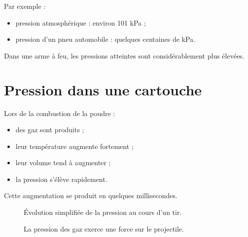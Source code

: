 Par exemple :

\begin{itemize}
    \item pression atmosphérique : environ 101 kPa ;
    \item pression d'un pneu automobile : quelques centaines de kPa.
\end{itemize}

Dans une arme à feu, les pressions atteintes sont considérablement plus
élevées.

\section{Pression dans une cartouche}

Lors de la combustion de la poudre :

\begin{itemize}
    \item des gaz sont produits ;
    \item leur température augmente fortement ;
    \item leur volume tend à augmenter ;
    \item la pression s'élève rapidement.
\end{itemize}

Cette augmentation se produit en quelques millisecondes.

\begin{figure}[htbp]
\centering


\caption{Évolution simplifiée de la pression au cours d'un tir.}
\label{fig:pression_tir}

\end{figure}

\begin{figure}[htbp]
\centering


\caption{La pression des gaz exerce une force sur le projectile.}
\label{fig:pression_projectile}

\end{figure}


